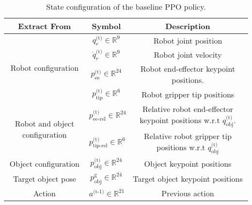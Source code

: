 \begin{table}[h]
\centering
\caption{State configuration of the baseline PPO policy.}\label{table:PPO_state}
\begin{tabular}{|c|c|c|}
\hline
\textbf{Extract From} &  \textbf{Symbol} & \textbf{Description} \\
\hline
\multirow{4}{*}{Robot configuration}& $q^\text{(t)}_r \in \mathbb{R}^9$ &Robot joint position  \\
\cline{2-3}
& $\dot{q}^\text{(t)}_r \in \mathbb{R}^9$ &Robot joint velocity  \\
\cline{2-3}
&  $p^\text{(t)}_\text{ee} \in \mathbb{R}^{24}$ & Robot end-effector keypoint positions. \\
\cline{2-3}
&  $p^\text{(t)}_\text{tip} \in \mathbb{R}^6$ & Robot gripper tip positions \\
\hline
\multirow{2}{*}{Robot and object configuration}& $p^\text{(t)}_\text{ee-rel} \in \mathbb{R}^{24}$ & \makecell{Relative robot end-effector \\ keypoint positions w.r.t $q^\text{(t)}_\text{obj}$}. \\
\cline{2-3}
&  $p^\text{(t)}_\text{tip-rel} \in \mathbb{R}^6$ & \makecell{Relative robot gripper \\ tip positions  w.r.t $q^\text{(t)}_\text{obj}$} \\
\hline
Object configuration&  $p^\text{(t)}_\text{obj} \in \mathbb{R}^{24}$ &Object keypoint positions  \\
\hline
Target object pose & $p^\text{g}_\text{obj} \in \mathbb{R}^{24}$ &Target object keypoint positions \\
\hline
Action & $a^\text{(t-1)} \in \mathbb{R}^{21}$ &Previous action \\
\hline
\end{tabular}
\vspace{-0.2cm}
\begin{flushleft}
\footnotesize
\end{flushleft}
\end{table}

